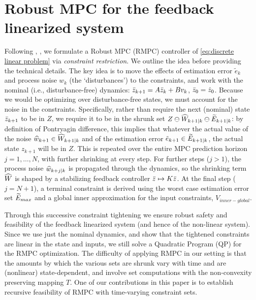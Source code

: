 \section{Robust MPC for the feedback linearized system}
\label{sec:feedback lin rmpc}

Following \cite{RichardsH05_RMPC}, \cite{PantAMNDM15_Anytime}, we formulate a Robust MPC (RMPC) controller of \eqref{eq:discrete linear problem} via \emph{constraint restriction}.
We outline the idea before providing the technical details.
The key idea is to move the effects of estimation error $\tilde{e}_k$ and  process noise $w_k$ (the `disturbances') to the constraints, and work with the nominal  (i.e., disturbance-free) dynamics: $\bar{z}_{k+1} = A\bar{z}_{k}+Bv_k$, $\bar{z}_{0} = \hat{z}_0$.
Because we would be optimizing over disturbance-free states, we must account for the noise in the constraints. 
Specifically, rather than require the next (nominal) state $\bar{z}_{k+1}$ to be in $Z$, we require it to be in the shrunk set $Z \ominus \widehat{W}_{k+1|k} \ominus \widetilde{E}_{k+1|k}$: 
by definition of Pontryagin difference, this implies that whatever the actual value of the noise $\widehat{w}_{k+1} \in \widehat{W}_{k+1|k}$ and of the estimation error $\tilde{e}_{k+1} \in \widetilde{E}_{k+1|k}$, the actual state $z_{k+1}$ will be in $Z$. 
This is repeated over the entire MPC prediction horizon $j=1,\ldots,N$, with further shrinking at every step.
For further steps ($j>1$), the process noise $\widehat{w}_{k+j|k}$ is propagated through the dynamics, so the shrinking term $\widehat{W}$ is shaped by a stabilizing feedback controller $\bar{z} \mapsto K\bar{z}$.
At the final step ($j=N+1$), a terminal constraint is derived using the worst case estimation error set $\widetilde{E}_{max}$ and a global inner approximation for the input constraints, $V_{inner-global}$. 

Through this successive constraint tightening we ensure robust safety and feasibility of the feedback linearized system (and hence of the non-linear system). 
Since we use just the nominal dynamics, and show that the tightened constraints are linear in the state and inputs, we still solve a Quadratic Program (QP) for the RMPC optimization.
The difficulty of applying RMPC in our setting is that the amounts by which the various sets are shrunk vary with time and are (nonlinear) state-dependent, and involve set computations with the non-convexity preserving mapping $T$.
One of our contributions in this paper is to establish recursive feasibility of RMPC with time-varying constraint sets.

